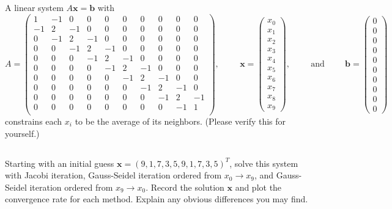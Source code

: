 A linear system $A\mathbf{x}=\mathbf{b}$ with
\begin{equation*}
A = 
\left(\begin{matrix}
1& -1& 0& 0& 0& 0& 0& 0& 0& 0\\
-1& 2& -1& 0& 0& 0& 0& 0& 0& 0\\
0& -1& 2& -1& 0& 0& 0& 0& 0& 0\\
0& 0& -1& 2& -1& 0& 0& 0& 0& 0\\
0& 0& 0& -1& 2& -1& 0& 0& 0& 0\\
0& 0& 0& 0& -1& 2& -1& 0& 0& 0\\
0& 0& 0& 0& 0& -1& 2& -1& 0& 0\\
0& 0& 0& 0& 0& 0& -1& 2& -1& 0\\
0& 0& 0& 0& 0& 0& 0& -1& 2& -1\\
0& 0& 0& 0& 0& 0& 0&  0&-1& 1\\
\end{matrix} \right),  \hspace{1cm} 
\mathbf{x} = \left(\begin{matrix}
x_0\\
x_1\\
x_2\\
x_3\\
x_4\\
x_5\\
x_6\\
x_7\\
x_8\\
x_9
\end{matrix} \right), \hspace{1cm} \text{and} \hspace{1cm}
\mathbf{b} = \left(\begin{matrix}
0\\
0\\
0\\
0\\
0\\
0\\
0\\
0\\
0\\
0
\end{matrix} \right)
\end{equation*}
constrains each $x_i$ to be the average of its neighbors. (Please verify this for yourself.)

\subsection{} Starting with an initial guess $\mathbf{x}=(9,1,7,3,5,9,1,7,3,5)^T$, solve this system with Jacobi iteration, Gauss-Seidel iteration ordered from $x_0 \to x_9$, and Gauss-Seidel iteration ordered from $x_9 \to x_0$. Record the solution $\mathbf{x}$ and plot the convergence rate for each method. Explain any obvious differences you may find.

